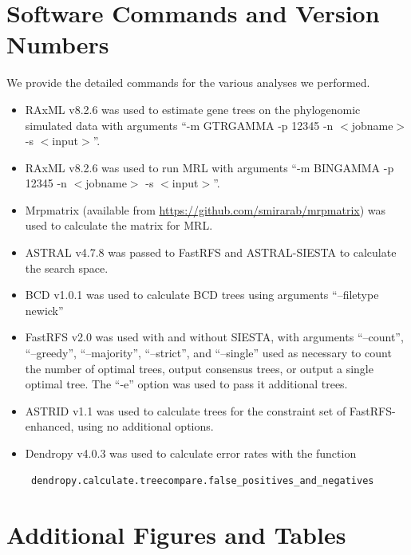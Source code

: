 
\section{Software Commands and Version Numbers}
We provide the detailed commands for the various analyses we performed.
\begin{itemize}
\item

RAxML v8.2.6 was used to estimate gene trees on the phylogenomic simulated data with arguments ``-m GTRGAMMA -p 12345 -n  $<$jobname$>$  -s  $<$input$>$''.
\item
RAxML v8.2.6 was used to run MRL with arguments ``-m BINGAMMA -p 12345 -n $<$jobname$>$ -s $<$input$>$''.
\item Mrpmatrix (available from \url{https://github.com/smirarab/mrpmatrix}) was used to calculate the matrix for MRL.
\item
ASTRAL v4.7.8 was passed to FastRFS and ASTRAL-SIESTA to calculate the search space.
\item
BCD v1.0.1 was used to calculate BCD trees using arguments ``--filetype newick''
\item
FastRFS v2.0 was used with and without SIESTA, with arguments
``--count'', ``--greedy'', ``--majority'', ``--strict'', and
``--single'' used as necessary to count the number of optimal trees,
output consensus trees, or output a single optimal tree. The ``-e''
option was used to pass it additional trees. 
\item
ASTRID v1.1 was used to calculate trees for  the constraint set of FastRFS-enhanced, using no additional options.
\item

Dendropy v4.0.3 was used to calculate error rates with the function

\begin{verbatim} dendropy.calculate.treecompare.false_positives_and_negatives\end{verbatim}

\end{itemize}


\clearpage

\section{Additional Figures and Tables}



